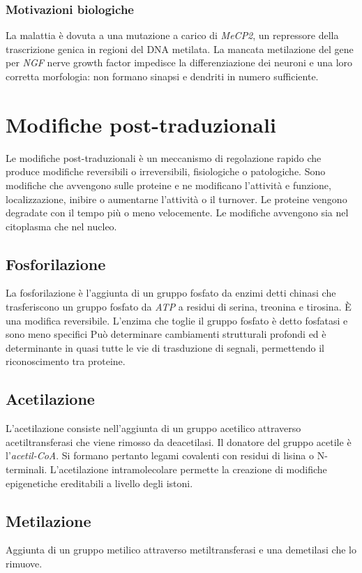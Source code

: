 		\subsubsection{Motivazioni biologiche}
		La malattia \`e dovuta a una mutazione a carico di \emph{MeCP2}, un repressore della trascrizione genica in regioni del DNA metilata.
		La mancata metilazione del gene per \emph{NGF} nerve growth factor impedisce la differenziazione dei neuroni e una loro corretta morfologia: non formano sinapsi e dendriti in numero sufficiente.

\section{Modifiche post-traduzionali}
Le modifiche post-traduzionali \`e un meccanismo di regolazione rapido che produce modifiche reversibili o irreversibili, fisiologiche o patologiche.
Sono modifiche che avvengono sulle proteine e ne modificano l'attivit\`a e funzione, localizzazione, inibire o aumentarne l'attivit\`a o il turnover. 
Le proteine vengono degradate con il tempo pi\`u o meno velocemente.
Le modifiche avvengono sia nel citoplasma che nel nucleo.

	\subsection{Fosforilazione}
	La fosforilazione \`e l'aggiunta di un gruppo fosfato da enzimi detti chinasi che trasferiscono un gruppo fosfato da \emph{ATP} a residui di serina, treonina e tirosina.
	\`E una modifica reversibile. 
	L'enzima che toglie il gruppo fosfato \`e detto fosfatasi e sono meno specifici
	Pu\`o determinare cambiamenti strutturali profondi ed \`e determinante in quasi tutte le vie di trasduzione di segnali, permettendo il riconoscimento tra proteine.

	\subsection{Acetilazione}
	L'acetilazione consiste nell'aggiunta di un gruppo acetilico attraverso acetiltransferasi che viene rimosso da deacetilasi. 
	Il donatore del gruppo acetile \`e l'\emph{acetil-CoA}.
	Si formano pertanto legami covalenti con residui di lisina o N-terminali.
	L'acetilazione intramolecolare permette la creazione di modifiche epigenetiche ereditabili a livello degli istoni.


	\subsection{Metilazione}
	Aggiunta di un gruppo metilico attraverso metiltransferasi e una demetilasi che lo rimuove. 

